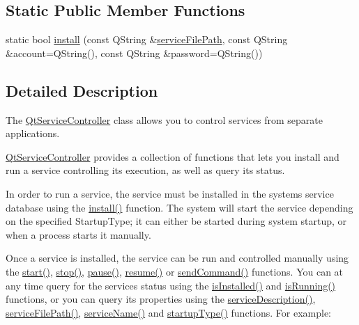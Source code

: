 \subsection*{Static Public Member Functions}
\begin{DoxyCompactItemize}
\item 
static bool \hyperlink{class_qt_service_controller_a7e2b85e911ff152557dd25959e76094b}{install} (const Q\+String \&\hyperlink{class_qt_service_controller_a5ab709fdeb3ab526c92ccbbe1b2706c6}{service\+File\+Path}, const Q\+String \&account=Q\+String(), const Q\+String \&password=Q\+String())
\end{DoxyCompactItemize}


\subsection{Detailed Description}
The \hyperlink{class_qt_service_controller}{Qt\+Service\+Controller} class allows you to control services from separate applications. 

\hyperlink{class_qt_service_controller}{Qt\+Service\+Controller} provides a collection of functions that lets you install and run a service controlling its execution, as well as query its status.

In order to run a service, the service must be installed in the system\textquotesingle{}s service database using the \hyperlink{class_qt_service_controller_a7e2b85e911ff152557dd25959e76094b}{install()} function. The system will start the service depending on the specified Startup\+Type; it can either be started during system startup, or when a process starts it manually.

Once a service is installed, the service can be run and controlled manually using the \hyperlink{class_qt_service_controller_a5e9d6da5081d70f31611456d0ef0687e}{start()}, \hyperlink{class_qt_service_controller_ad06afa647666769e309474b18bf7cf90}{stop()}, \hyperlink{class_qt_service_controller_aeee2fcc9469f77c7ed8a7955c4fa3a07}{pause()}, \hyperlink{class_qt_service_controller_a2d71eab6146427fc7b431386bf72eaec}{resume()} or \hyperlink{class_qt_service_controller_a1428c7d51403416bc7663ae37c446cfc}{send\+Command()} functions. You can at any time query for the service\textquotesingle{}s status using the \hyperlink{class_qt_service_controller_a7e36fb18a273118709faf22f732feac4}{is\+Installed()} and \hyperlink{class_qt_service_controller_a4a11b35468848388174a36af66f25fc3}{is\+Running()} functions, or you can query its properties using the \hyperlink{class_qt_service_controller_a503c0fadf098b4c5bbccbb2a57f911e2}{service\+Description()}, \hyperlink{class_qt_service_controller_a5ab709fdeb3ab526c92ccbbe1b2706c6}{service\+File\+Path()}, \hyperlink{class_qt_service_controller_a3df972ecd01a00fff5cda316ae35cbea}{service\+Name()} and \hyperlink{class_qt_service_controller_acfd3b5cb23c17bf415f1d606b8461109}{startup\+Type()} functions. For example\+:


